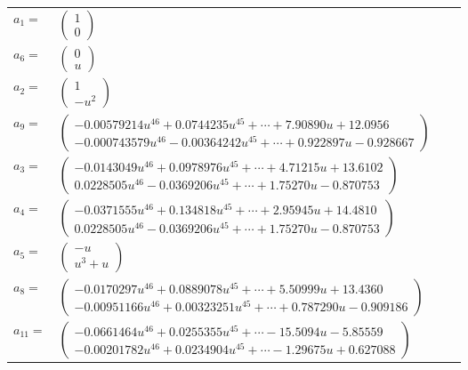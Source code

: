 \documentclass[1p]{elsarticle_modified}
\theoremstyle{definition}
\begin{document}
\begin{tabular}{m{7pt} m{180pt} m{7pt} m{180pt} }
\flushright $a_{1}=$&$\begin{pmatrix}1\\0\end{pmatrix}$ \\
\flushright $a_{6}=$&$\begin{pmatrix}0\\u\end{pmatrix}$ \\
\flushright $a_{2}=$&$\begin{pmatrix}1\\- u^2\end{pmatrix}$ \\
\flushright $a_{9}=$&$\begin{pmatrix}-0.00579214 u^{46}+0.0744235 u^{45}+\cdots+7.90890 u+12.0956\\-0.000743579 u^{46}-0.00364242 u^{45}+\cdots+0.922897 u-0.928667\end{pmatrix}$ \\
\flushright $a_{3}=$&$\begin{pmatrix}-0.0143049 u^{46}+0.0978976 u^{45}+\cdots+4.71215 u+13.6102\\0.0228505 u^{46}-0.0369206 u^{45}+\cdots+1.75270 u-0.870753\end{pmatrix}$ \\
\flushright $a_{4}=$&$\begin{pmatrix}-0.0371555 u^{46}+0.134818 u^{45}+\cdots+2.95945 u+14.4810\\0.0228505 u^{46}-0.0369206 u^{45}+\cdots+1.75270 u-0.870753\end{pmatrix}$ \\
\flushright $a_{5}=$&$\begin{pmatrix}- u\\u^3+u\end{pmatrix}$ \\
\flushright $a_{8}=$&$\begin{pmatrix}-0.0170297 u^{46}+0.0889078 u^{45}+\cdots+5.50999 u+13.4360\\-0.00951166 u^{46}+0.00323251 u^{45}+\cdots+0.787290 u-0.909186\end{pmatrix}$ \\
\flushright $a_{11}=$&$\begin{pmatrix}-0.0661464 u^{46}+0.0255355 u^{45}+\cdots-15.5094 u-5.85559\\-0.00201782 u^{46}+0.0234904 u^{45}+\cdots-1.29675 u+0.627088\end{pmatrix}$ \\

\end{tabular}
\end{document}
